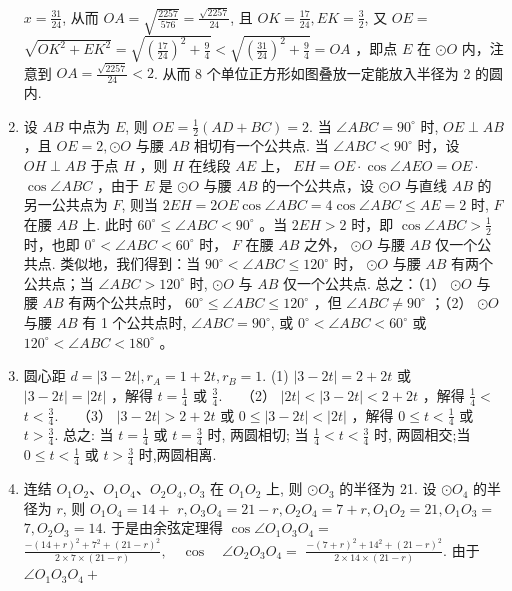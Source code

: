\documentclass[10pt]{article}
\begin{document}
\begin{enumerate}
$x=\frac{31}{24}$, 从而 $O A=\sqrt{\frac{2257}{576}}=\frac{\sqrt{2257}}{24}$, 且 $O K=\frac{17}{24}, E K=\frac{3}{2}$, 又 $O E=$ $\sqrt{O K^{2}+E K^{2}}=\sqrt{\left(\frac{17}{24}\right)^{2}+\frac{9}{4}}<\sqrt{\left(\frac{31}{24}\right)^{2}+\frac{9}{4}}=O A$ ，即点 $E$ 在 $\odot O$ 内，注意到 $O A=\frac{\sqrt{2257}}{24}<2$. 从而 8 个单位正方形如图叠放一定能放入半径为 2 的圆内.
  \item 设 $A B$ 中点为 $E$, 则 $O E=\frac{1}{2}(A D+B C)=2$. 当 $\angle A B C=90^{\circ}$ 时, $O E \perp A B$ ，且 $O E=2, \odot O$ 与腰 $A B$ 相切有一个公共点. 当 $\angle A B C<90^{\circ}$ 时，设 $O H \perp A B$ 于点 $H$ ，则 $H$ 在线段 $A E$ 上， $E H=O E \cdot \cos \angle A E O=O E \cdot$ $\cos \angle A B C$ ，由于 $E$ 是 $\odot O$ 与腰 $A B$ 的一个公共点，设 $\odot O$ 与直线 $A B$ 的另一公共点为 $F$, 则当 $2 E H=2 O E \cos \angle A B C=4 \cos \angle A B C \leqslant A E=2$ 时, $F$ 在腰 $A B$ 上. 此时 $60^{\circ} \leqslant \angle A B C<90^{\circ}$ 。当 $2 E H>2$ 时，即 $\cos \angle A B C>\frac{1}{2}$ 时，也即 $0^{\circ}<\angle A B C<60^{\circ}$ 时， $F$ 在腰 $A B$ 之外， $\odot O$ 与腰 $A B$ 仅一个公共点. 类似地，我们得到：当 $90^{\circ}<\angle A B C \leqslant 120^{\circ}$ 时， $\odot O$ 与腰 $A B$ 有两个公共点；当 $\angle A B C>120^{\circ}$ 时, $\odot O$ 与 $A B$ 仅一个公共点. 总之：（1） $\odot O$ 与腰 $A B$ 有两个公共点时， $60^{\circ} \leqslant \angle A B C \leqslant 120^{\circ}$ ，但 $\angle A B C \neq 90^{\circ}$ ；（2） $\odot O$ 与腰 $A B$ 有 1 个公共点时, $\angle A B C=90^{\circ}$, 或 $0^{\circ}<\angle A B C<60^{\circ}$ 或 $120^{\circ}<\angle A B C<180^{\circ}$ 。
  \item 圆心距 $d=|3-2 t|, r_{A}=1+2 t, r_{B}=1$. (1) $|3-2 t|=2+2 t$ 或\\
$|3-2 t|=|2 t|$ ，解得 $t=\frac{1}{4}$ 或 $\frac{3}{4} . \quad$ （2） $|2 t|<|3-2 t|<2+2 t$ ，解得 $\frac{1}{4}<$ $t<\frac{3}{4} . \quad$ （3） $|3-2 t|>2+2 t$ 或 $0 \leqslant|3-2 t|<|2 t|$ ，解得 $0 \leqslant t<\frac{1}{4}$ 或 $t>\frac{3}{4}$. 总之: 当 $t=\frac{1}{4}$ 或 $t=\frac{3}{4}$ 时, 两圆相切; 当 $\frac{1}{4}<t<\frac{3}{4}$ 时, 两圆相交;当 $0 \leqslant t<\frac{1}{4}$ 或 $t>\frac{3}{4}$ 时,两圆相离.
  \item 连结 $O_{1} O_{2} 、 O_{1} O_{4} 、 O_{2} O_{4}, O_{3}$ 在 $O_{1} O_{2}$ 上, 则 $\odot O_{3}$ 的半径为 21. 设 $\odot O_{4}$ 的半径为 $r$, 则 $O_{1} O_{4}=14+$ $r, O_{3} O_{4}=21-r, O_{2} O_{4}=7+r, O_{1} O_{2}=21, O_{1} O_{3}=$ $7, O_{2} O_{3}=14$. 于是由余弦定理得 $\cos \angle O_{1} O_{3} O_{4}=$ $\frac{-(14+r)^{2}+7^{2}+(21-r)^{2}}{2 \times 7 \times(21-r)}, \quad \cos \quad \angle O_{2} O_{3} O_{4}=$ $\frac{-(7+r)^{2}+14^{2}+(21-r)^{2}}{2 \times 14 \times(21-r)}$. 由于 $\angle O_{1} O_{3} O_{4}+$\\

\end{enumerate}
\end{document}
